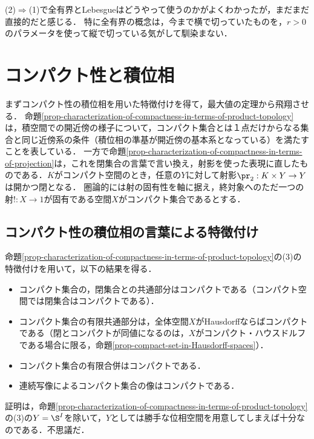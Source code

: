 \documentclass[uplatex,dvipdfmx]{jsreport}
\begin{document}
\begin{remarks}
    (2)$\Rightarrow$(1)で全有界とLebesgueはどうやって使うのかがよくわかったが，まだまだ直接的だと感じる．
    特に全有界の概念は，今まで横で切っていたものを，$r>0$のパラメータを使って縦で切っている気がして馴染まない．
\end{remarks}

\section{コンパクト性と積位相}

\begin{tcolorbox}[colframe=ForestGreen, colback=ForestGreen!10!white, breakable ,colbacktitle=ForestGreen!40!white, coltitle=black,fonttitle=\bfseries\sffamily
    ,title=コンパクト性の概念の遊離：積位相で見ると一点と同じ開近傍の様子を持つ]
    まずコンパクト性の積位相を用いた特徴付けを得て，最大値の定理から飛翔させる．
    命題\ref{prop-characterization-of-compactness-in-terms-of-product-topology}は，積空間での開近傍の様子について，コンパクト集合とは１点だけからなる集合と同じ近傍系の条件（積位相の準基が開近傍の基本系となっている）を満たすことを表している．
    一方で命題\ref{prop-characterization-of-compactness-in-terms-of-projection}は，これを閉集合の言葉で言い換え，射影を使った表現に直したものである．$K$がコンパクト空間のとき，任意の$Y$に対して射影$\pr_2:K\times Y\to Y$は開かつ閉となる．
    圏論的には射の固有性を軸に据え，終対象へのただ一つの射$!:X\to 1$が固有である空間$X$がコンパクト集合であるとする．
\end{tcolorbox}

\subsection{コンパクト性の積位相の言葉による特徴付け}

\begin{tcolorbox}[colframe=ForestGreen, colback=ForestGreen!10!white, breakable ,colbacktitle=ForestGreen!40!white, coltitle=black,fonttitle=\bfseries\sffamily
    ,title=コンパクト性の特徴付けとその応用]
    命題\ref{prop-characterization-of-compactness-in-terms-of-product-topology}の(3)の特徴付けを用いて，以下の結果を得る．
    \begin{itemize}
        \item コンパクト集合の，閉集合との共通部分はコンパクトである（コンパクト空間では閉集合はコンパクトである）．
        \item コンパクト集合の有限共通部分は，全体空間$X$がHausdorffならばコンパクトである（閉とコンパクトが同値になるのは，$X$がコンパクト・ハウスドルフである場合に限る，命題\ref{prop-compact-set-in-Hausdorff-spaces}）．
        \item コンパクト集合の有限合併はコンパクトである．
        \item 連続写像によるコンパクト集合の像はコンパクトである．
    \end{itemize}
    証明は，命題\ref{prop-characterization-of-compactness-in-terms-of-product-topology}の(3)の$Y=\S^I$を除いて，$Y$としては勝手な位相空間を用意してしまえば十分なのである．不思議だ．
\end{tcolorbox}
\end{document}
